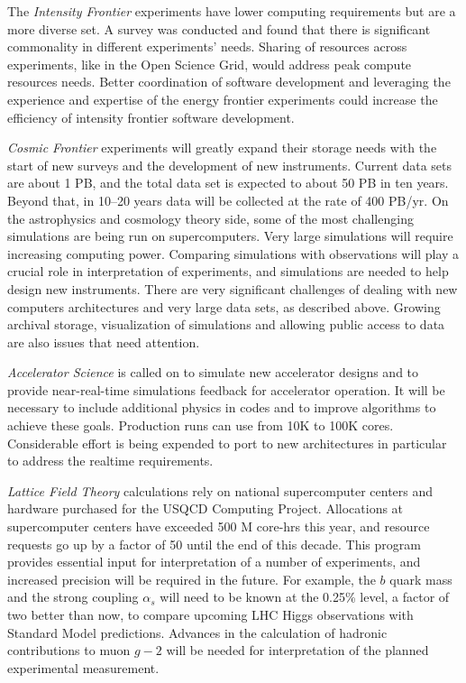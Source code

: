 The {\it Intensity Frontier} experiments have lower computing requirements
but are a more diverse set. A survey was conducted and found that there is
significant commonality in different experiments' needs. Sharing of
resources across experiments, like in the Open Science Grid, would address
peak compute resources needs. Better coordination of software development
and leveraging the experience and expertise of the energy frontier
experiments could increase the efficiency of intensity frontier software
development.

{\it Cosmic Frontier} experiments will greatly expand their storage needs
with the start of new surveys and the development of new instruments.
Current data sets are about 1 PB, and the total data set is expected to
about 50 PB in ten years. Beyond that, in 10--20 years data will be
collected at the rate of 400 PB/yr. On the astrophysics and cosmology
theory side, some of the most challenging simulations are being run on
supercomputers. Very large simulations will require increasing computing
power. Comparing simulations with observations will play a crucial role in
interpretation of experiments, and simulations are needed to help design
new instruments. There are very significant challenges of dealing with new
computers architectures and very large data sets, as described above.
Growing archival storage, visualization of simulations and allowing public
access to data are also issues that need attention.

{\it Accelerator Science} is called on to simulate new accelerator designs
and to provide near-real-time simulations feedback for accelerator
operation. It will be necessary to include additional physics in codes and
to improve algorithms to achieve these goals. Production runs can use from
10K to 100K cores. Considerable effort is being expended to port to new
architectures in particular to address the realtime requirements.

{\it Lattice Field Theory} calculations rely on national supercomputer
centers and hardware purchased for the USQCD Computing Project. Allocations
at supercomputer centers have exceeded 500 M core-hrs this year, and
resource requests go up by a factor of 50 until the end of this decade.
This program provides essential input for interpretation of a number of
experiments, and increased precision will be required in the future. For
example, the $b$ quark mass and the strong coupling $\alpha_s$ will need to
be known at the 0.25\% level, a factor of two better than now, to compare
upcoming LHC Higgs observations with Standard Model predictions. Advances
in the calculation of hadronic contributions to muon $g-2$ will be needed
for interpretation of the planned experimental measurement.

